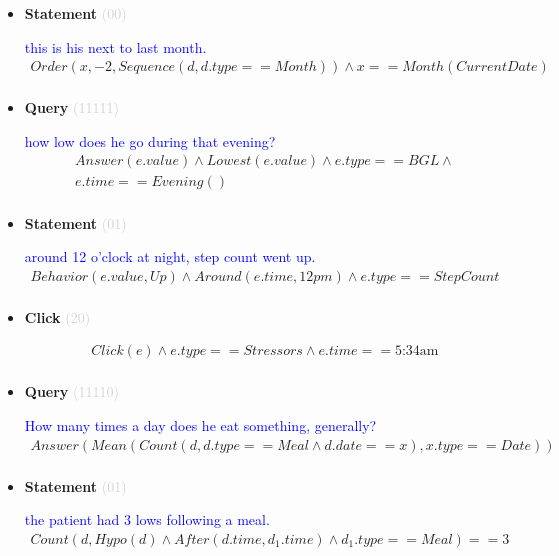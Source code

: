 \documentclass[11pt]{article}
\newcommand{\key}[1]{\textcolor{lightgray}{#1}}
\newcounter{CQuery}
\newcounter{CStatement}
\newcounter{CClick}
\begin{document}
\begin{itemize}
\item
\textbf{Statement\theCStatement} \key{(00)} \addtocounter{CStatement}{1}
\textcolor{blue}{ this is his next to last month. }
\begin{multline*}
Order(x, -2, Sequence(d, d.type==Month)) \wedge x==Month(CurrentDate) \\ 
\end{multline*}


\item
\textbf{Query\theCQuery} \key{(11111)} \addtocounter{CQuery}{1}
\textcolor{blue}{ how low does he go during that evening? }
\begin{multline*}
Answer(e.value) \wedge Lowest(e.value) \wedge e.type==BGL \wedge \\ 
e.time==Evening() \\ 
\end{multline*}


\item
\textbf{Statement\theCStatement} \key{(01)} \addtocounter{CStatement}{1}
\textcolor{blue}{ around 12 o'clock at night, step count went up. }
\begin{multline*}
Behavior(e.value, Up) \wedge Around(e.time, 12pm) \wedge e.type==StepCount \\ 
\end{multline*}


\item
\textbf{Click\theCClick} \key{(20)} \addtocounter{CClick}{1}
\textcolor{blue}{  }
\begin{multline*}
Click(e) \wedge e.type==Stressors \wedge e.time==\mbox{5:34am} \\ 
\end{multline*}


\item
\textbf{Query\theCQuery} \key{(11110)} \addtocounter{CQuery}{1}
\textcolor{blue}{ How many times a day does he eat something, generally? }
\begin{multline*}
Answer(Mean(Count(d, d.type==Meal \wedge d.date==x), x.type==Date)) \\ 
\end{multline*}


\item
\textbf{Statement\theCStatement} \key{(01)} \addtocounter{CStatement}{1}
\textcolor{blue}{ the patient had 3 lows following a meal. }
\begin{multline*}
Count(d, Hypo(d) \wedge After(d.time, d_1.time) \wedge d_1.type==Meal)==3 \\ 
\end{multline*}



\end{itemize}
\end{document}
